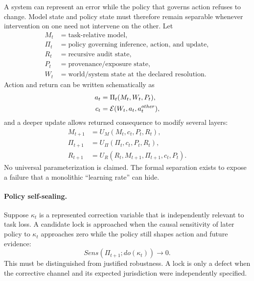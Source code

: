 A system can represent an error while the policy that governs action refuses to change. Model state and policy state must therefore remain separable whenever intervention on one need not intervene on the other. Let
\begin{align}
M_t &= \text{task-relative model},\\
\Pi_t &= \text{policy governing inference, action, and update},\\
R_t &= \text{recursive audit state},\\
P_t &= \text{provenance/exposure state},\\
W_t &= \text{world/system state at the declared resolution}.
\end{align}
Action and return can be written schematically as
\begin{align}
a_t &= \Pi_t(M_t,W_t,P_t),\\
c_t &= \mathcal{E}(W_t,a_t,a_t^{other}),
\end{align}
and a deeper update allows returned consequence to modify several layers:
\begin{align}
M_{t+1} &= U_M(M_t,c_t,P_t,R_t),\\
\Pi_{t+1} &= U_{\Pi}(\Pi_t,c_t,P_t,R_t),\\
R_{t+1} &= U_R(R_t,M_{t+1},\Pi_{t+1},c_t,P_t).
\end{align}
No universal parameterization is claimed. The formal separation exists to expose a failure that a monolithic ``learning rate'' can hide.

\paragraph{Policy self-sealing.}
Suppose $\kappa_t$ is a represented correction variable that is independently relevant to task loss. A candidate lock is approached when the causal sensitivity of later policy to $\kappa_t$ approaches zero while the policy still shapes action and future evidence:
\begin{equation}
Sens(\Pi_{t+1};do(\kappa_t))\rightarrow 0.
\label{eq:deep-policy-lock}
\end{equation}
This must be distinguished from justified robustness. A lock is only a defect when the corrective channel and its expected jurisdiction were independently specified.

